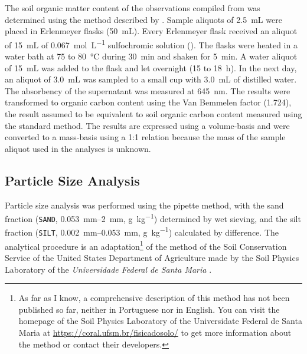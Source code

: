 The soil organic matter content of the observations compiled from  was determined 
using the method described by . Sample aliquots of \SI{2.5}{\milli\liter}
were placed in Erlenmeyer flasks (\SI{50}{\milli\liter}). Every Erlenmeyer flask received an aliquot of 
\SI{15}{\milli\liter} of \SI{0.067}{\mole\per\liter} sulfochromic solution (). The 
flasks were heated in a water bath at \num{75} to \SI{80}{\celsius} during \SI{30}{\minute} and shaken 
for \SI{5}{\minute}. A water aliquot of \SI{15}{\milli\liter} was added to the flask and let overnight 
(\num{15} to \SI{18}{\hour}). In the next day, an aliquot of \SI{3.0}{\milli\liter} was sampled to a 
small cup with \SI{3.0}{\milli\liter} of distilled water. The absorbency of the supernatant was measured 
at \SI{645}{\nano\metre}. The results were transformed to organic carbon content using the Van Bemmelen 
factor (\num{1.724}), the result assumed to be equivalent to soil organic carbon content measured using the 
standard method. The results are expressed using a volume-basis and were converted to a mass-basis using a
1:1 relation because the mass of the sample aliquot used in the analyses is unknown.

\subsection{Particle Size Analysis}
\label{chap:chap04-granulometry}

\def\footsuzuki{\footnote{As far as I know, a comprehensive description of this method has not been 
published so far, neither in Portuguese nor in English. You can visit the homepage of the Soil Physics 
Laboratory of the Universidate Federal de Santa Maria at \url{https://coral.ufsm.br/fisicadosolo/} to get more 
information about the method or contact their developers.}}

Particle size analysis was performed using the pipette method, with the sand fraction (\texttt{SAND}, 
\SIrange{0.053}{2}{\milli\metre}, \si{\gram\per\kilo\gram}) determined by wet sieving, and the silt fraction 
(\texttt{SILT}, \SIrange{0.002}{0.053}{\milli\metre}, \si{\gram\per\kilo\gram}) calculated by difference. 
The analytical procedure is an adaptation\footsuzuki{} of the method of the Soil Conservation Service of 
the United States Department of Agriculture \cite{UnitedStates1972} made by the Soil Physics Laboratory of the 
\textit{Universidade Federal de Santa Maria} \cite{SuzukiEtAl2004, SuzukiEtAl2004a}.

